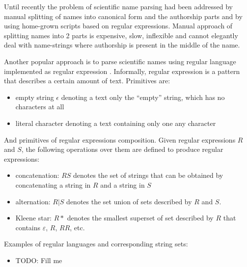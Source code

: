 \documentclass{bmcart}
\begin{document}
Until recently the problem of scientific name parsing had been addressed by
manual splitting of names into canonical form and the authorship parts and
by using home-grown scripts based on regular expressions. Manual approach of
splitting names into 2 parts is expensive, slow, inflexible and cannot
elegantly deal with name-strings where authorship is present in the middle of
the name.

Another popular approach is to parse scientific names using regular language
implemented as regular expression \cite{aho1992foundations}. Informally, regular
expression is a pattern that describes a certain amount of text. Primitives are:

\begin{itemize}
  \item empty string $\epsilon$ denoting a text only the
  ``empty'' string, which has no characters at all
  \item literal character denoting a text containing only one any character
\end{itemize}

And primitives of regular expressions composition. Given regular expressions
$R$ and $S$, the following operations over them are defined to produce regular
expressions:

\begin{itemize}
  \item concatenation: $RS$ denotes the set of strings that can be obtained
  by concatenating a string in $R$ and a string in $S$
  \item alternation: $R \vert S$ denotes the set union of sets described by
  $R$ and $S$.
  \item Kleene star: $R*$ denotes the smallest superset of set described by
  $R$ that contains $\varepsilon$, $R$, $RR$, etc.
\end{itemize}

Examples of regular languages and corresponding string sets:

\begin{itemize}
    \item TODO: Fill me
\end{itemize}
\end{document}
